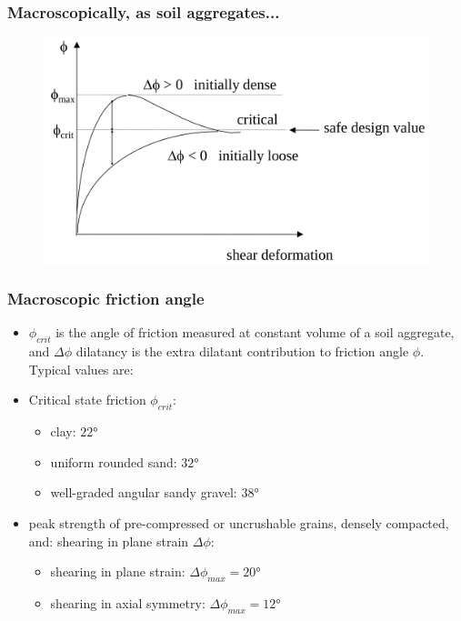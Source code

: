 \documentclass[notes]{beamer}
\begin{document}
\begin{frame}
\frametitle{Macroscopically, as soil aggregates...}
\begin{figure}
	\includegraphics[width=\textwidth]{figs/macroscopic-friction.png}
\end{figure}
\end{frame}

\begin{frame}
\frametitle{Macroscopic friction angle}
\begin{itemize}
	\item $\phi_{crit}$ is the angle of friction measured at constant volume of a soil
	aggregate, and $\Delta \phi$ dilatancy is the extra dilatant contribution to
	friction angle $\phi$. Typical values are:
	\item Critical state friction $\phi_{crit}$:
	\begin{itemize}
		\item clay: $\ang{22}$
		\item uniform rounded sand: $\ang{32}$
		\item well-graded angular sandy gravel: $\ang{38}$
	\end{itemize}
	\item peak strength of pre-compressed or uncrushable grains, densely compacted, and:
	shearing in plane strain $\Delta \phi$:
	\begin{itemize}
		\item shearing in plane strain: $\Delta \phi_{max} = \ang{20}$
		\item shearing in axial symmetry: $\Delta \phi_{max} = \ang{12}$
	\end{itemize}
\end{itemize}
\end{frame}
\end{document}
